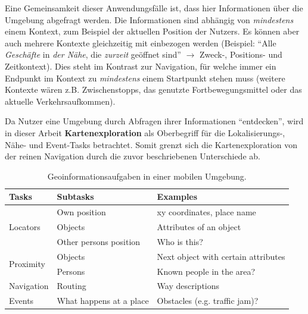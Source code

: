 Eine Gemeinsamkeit dieser Anwendungsfälle ist, dass hier Informationen über die Umgebung abgefragt werden.
Die Informationen sind abhängig von \emph{mindestens} einem Kontext, zum Beispiel der aktuellen Position der Nutzers.
Es können aber auch mehrere Kontexte gleichzeitig mit einbezogen werden (Beispiel: \enquote{Alle \emph{Geschäfte} in \emph{der Nähe}, die \emph{zurzeit} geöffnet sind} $\rightarrow$ Zweck-, Positions- und Zeitkontext).
Dies steht im Kontrast zur Navigation, für welche immer ein Endpunkt im Kontext zu \emph{mindestens} einem Startpunkt stehen muss (weitere Kontexte wären z.B. Zwischenstopps, das genutzte Fortbewegungsmittel oder das aktuelle Verkehrsaufkommen).

Da Nutzer eine Umgebung durch Abfragen ihrer Informationen \enquote{entdecken}, wird in dieser Arbeit \textbf{Kartenexploration} als Oberbegriff für die Lokalisierungs-, Nähe- und Event-Tasks betrachtet.
Somit grenzt sich die Kartenexploration von der reinen Navigation durch die zuvor beschriebenen Unterschiede ab.

\begin{table}[tbh]
    \centering
    \caption{Geoinformationsaufgaben in einer mobilen Umgebung. }
    \label{tab:gis_user_tasks}
    \begin{tabular}{@{}lll@{}}\toprule
        \textsf{\textbf{Tasks}} & \textsf{\textbf{Subtasks}} & \textsf{\textbf{Examples}}\\ \midrule
        \multirow{3}{*}{Locators} & Own position & xy coordinates, place name \\
                                  & Objects & Attributes of an object\\
                                  & Other persons position & Who is this?\\ \midrule
        \multirow{2}{*}{Proximity} & Objects & Next object with certain attributes\\
                                   & Persons & Known people in the area?\\ \midrule
        Navigation & Routing & Way descriptions\\ \midrule
        Events & What happens at a place & Obstacles (e.g. traffic jam)?\\ \bottomrule
    \end{tabular}
    \vspace{0.5em}
\end{table}

